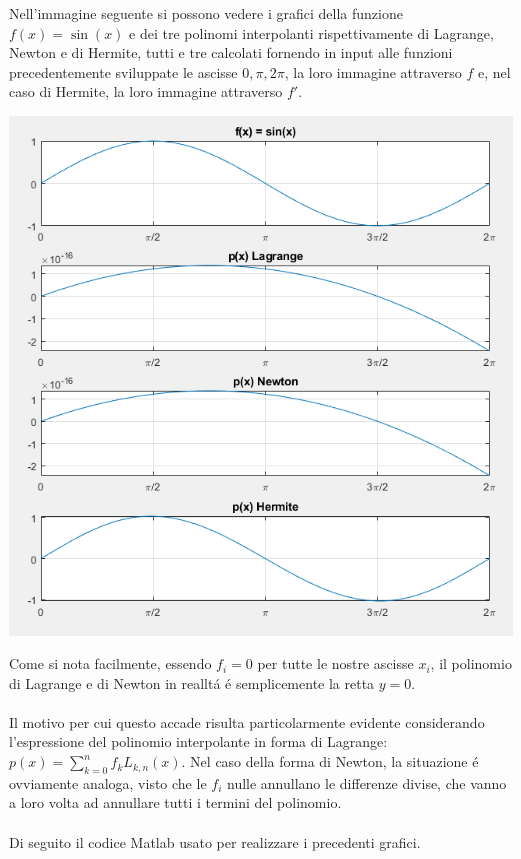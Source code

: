 \begin{center}
\footnotesize\noindent{}\end{center}

\noindent Nell'immagine seguente si possono vedere i grafici della funzione \(f(x) = \sin(x)\) e dei tre polinomi interpolanti rispettivamente di Lagrange, Newton e di Hermite, tutti e tre calcolati fornendo in input alle funzioni precedentemente sviluppate le ascisse \(0, \pi, 2\pi \), la loro immagine attraverso \(f\) e, nel caso di Hermite, la loro immagine attraverso \(f'\).
\begin{center}
	\includegraphics[scale=0.7]{cap4/4_4.png}
\end{center}
\noindent Come si nota facilmente, essendo \(f_i=0\) per tutte le nostre ascisse \(x_i\), il polinomio di Lagrange e di Newton in reallt\'a \'e semplicemente la retta \(y=0\). \\ \\
\noindent Il motivo per cui questo accade risulta particolarmente evidente considerando l'espressione del polinomio interpolante in forma di Lagrange: \( p(x) = \sum_{k=0}^{n}f_{k}L_{k,n}(x) \). Nel caso della forma di Newton, la situazione \'e ovviamente analoga, visto che le \(f_i\) nulle annullano le differenze divise, che vanno a loro volta ad annullare tutti i termini del polinomio. \\ \\
\noindent Di seguito il codice Matlab usato per realizzare i precedenti grafici.


